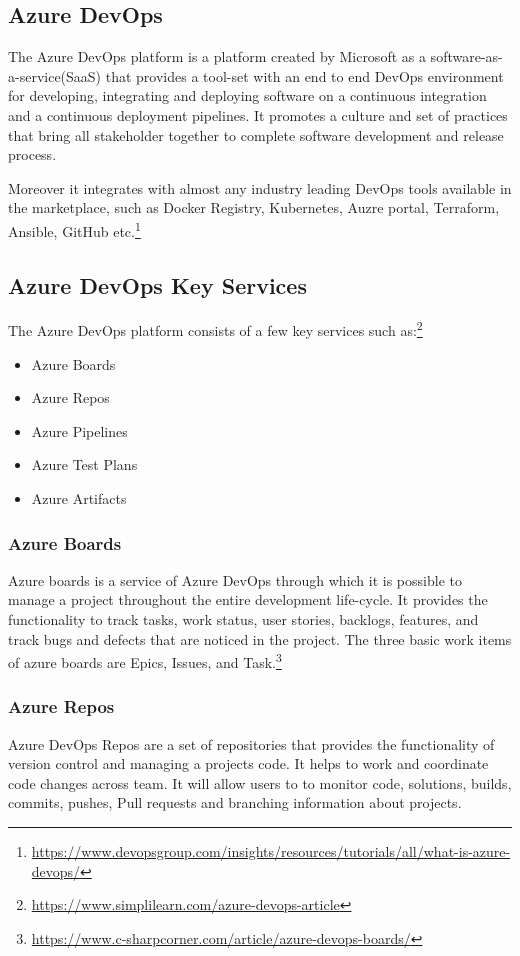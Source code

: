 \subsection{Azure DevOps}
%
The Azure DevOps platform is a platform created by Microsoft as a software-as-a-service(SaaS) that provides a tool-set with an end to end DevOps environment for developing, integrating and deploying software on a continuous integration and a continuous deployment pipelines. It promotes a culture and set of practices  that bring all stakeholder together to complete software development and release process. 

Moreover it integrates with almost any industry leading DevOps tools available in the marketplace, such as Docker Registry, Kubernetes, Auzre portal, Terraform, Ansible, GitHub etc.\footnote{\url{https://www.devopsgroup.com/insights/resources/tutorials/all/what-is-azure-devops/}}
%

\subsection{Azure DevOps Key Services}
%
The Azure DevOps platform consists of a few key services such as:\footnote{\url{https://www.simplilearn.com/azure-devops-article}}
\begin{itemize}
    \item Azure Boards
    \item Azure Repos
    \item Azure Pipelines
    \item Azure Test Plans
    \item Azure Artifacts
\end{itemize}
%

\subsubsection{Azure Boards}
%
Azure boards is a service of Azure DevOps through which it is possible to manage a project throughout the entire development life-cycle. It provides the functionality to track tasks, work status, user stories, backlogs, features, and track bugs and defects that are noticed in the project. The three basic work items of azure boards are Epics, Issues, and Task.\footnote{\url{https://www.c-sharpcorner.com/article/azure-devops-boards/}}
%
\subsubsection{Azure Repos}
%
Azure DevOps Repos are a set of repositories that provides the functionality of version control and managing a projects code. It helps to work and coordinate code changes across team. It will allow users to to monitor code, solutions, builds, commits, pushes, Pull requests and branching information about projects. 

